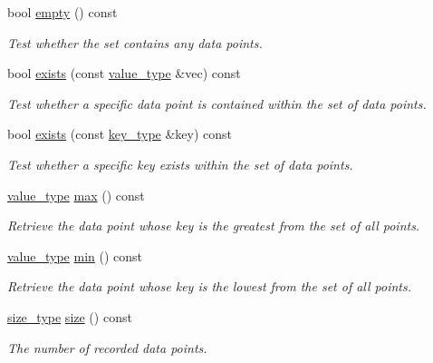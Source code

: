\begin{DoxyCompactItemize}
bool \hyperlink{classmetrobotics_1_1Lerp_aaa9cb47196fe501994cc0c86e5543f1b}{empty} () const 
\begin{DoxyCompactList}\small\item\em \-Test whether the set contains any data points. \end{DoxyCompactList}\item 
bool \hyperlink{classmetrobotics_1_1Lerp_aea3a0d4ffa69f810c42f90be809441e2}{exists} (const \hyperlink{classmetrobotics_1_1Lerp_ab1be5a6a96856f10c5eadc416d630a40}{value\-\_\-type} \&vec) const 
\begin{DoxyCompactList}\small\item\em \-Test whether a specific data point is contained within the set of data points. \end{DoxyCompactList}\item 
bool \hyperlink{classmetrobotics_1_1Lerp_a37f9270ce1cdf3d2ed4ba12e1ae41fc9}{exists} (const \hyperlink{classmetrobotics_1_1Lerp_a3cd6f9215623083b5ed90f4c03ac6dc7}{key\-\_\-type} \&key) const 
\begin{DoxyCompactList}\small\item\em \-Test whether a specific key exists within the set of data points. \end{DoxyCompactList}\item 
\hyperlink{classmetrobotics_1_1Lerp_ab1be5a6a96856f10c5eadc416d630a40}{value\-\_\-type} \hyperlink{classmetrobotics_1_1Lerp_a846e1b0be29fff0a03eccda9e240db8a}{max} () const 
\begin{DoxyCompactList}\small\item\em \-Retrieve the data point whose key is the greatest from the set of all points. \end{DoxyCompactList}\item 
\hyperlink{classmetrobotics_1_1Lerp_ab1be5a6a96856f10c5eadc416d630a40}{value\-\_\-type} \hyperlink{classmetrobotics_1_1Lerp_ae2ec25f3e7dc72d6f03f99e84687865a}{min} () const 
\begin{DoxyCompactList}\small\item\em \-Retrieve the data point whose key is the lowest from the set of all points. \end{DoxyCompactList}\item 
\hyperlink{classmetrobotics_1_1Lerp_a10263c93dd1cabed5b5c06585f13c272}{size\-\_\-type} \hyperlink{classmetrobotics_1_1Lerp_adca8a45e6771cb87b6db6146ac1d6a1c}{size} () const 
\begin{DoxyCompactList}\small\item\em \-The number of recorded data points. \end{DoxyCompactList}\item 

\end{DoxyCompactItemize}
